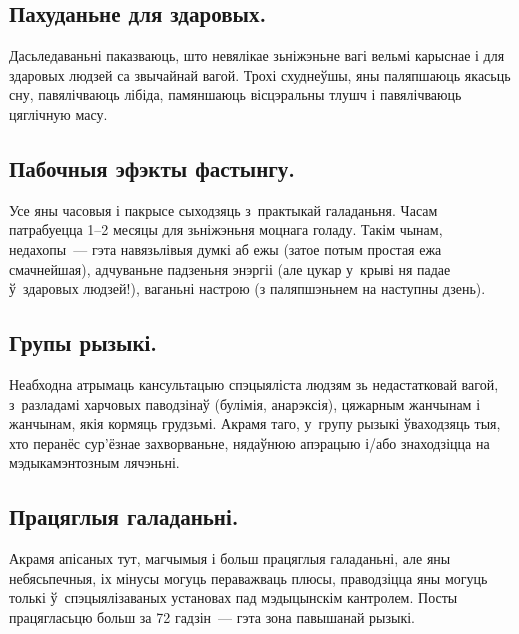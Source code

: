 \subsection{Пахуданьне для здаровых.}
Дасьледаваньні паказваюць, што невялікае зьніжэньне вагі вельмі карыснае і для здаровых людзей са звычайнай вагой. Трохі схуднеўшы, яны паляпшаюць якасьць сну, павялічваюць лібіда, памяншаюць вісцэральны тлушч і павялічваюць цяглічную масу.

\subsection{Пабочныя эфэкты фастынгу.}
Усе яны часовыя і пакрысе сыходзяць з~практыкай галаданьня. Часам патрабуецца 1--2 месяцы для зьніжэньня моцнага голаду. Такім чынам, недахопы~--- гэта навязьлівыя думкі аб ежы (затое потым простая ежа смачнейшая), адчуваньне падзеньня энэргіі (але цукар у~крыві ня падае ў~здаровых людзей!), ваганьні настрою (з паляпшэньнем на наступны дзень).

\subsection{Групы рызыкі.}
Неабходна атрымаць кансультацыю спэцыяліста людзям зь недастатковай вагой, з~разладамі харчовых паводзінаў (булімія, анарэксія), цяжарным жанчынам і жанчынам, якія кормяць грудзьмі. Акрамя таго, у~групу рызыкі ўваходзяць тыя, хто перанёс сур'ёзнае захворваньне, нядаўнюю апэрацыю і/або знаходзіцца на мэдыкамэнтозным лячэньні.


\subsection{Працяглыя галаданьні.}
Акрамя апісаных тут, магчымыя і больш працяглыя галаданьні, але яны небясьпечныя, іх мінусы могуць пераважваць плюсы, праводзіцца яны могуць толькі ў~спэцыялізаваных установах пад мэдыцынскім кантролем. Посты працягласьцю больш за 72 гадзін~--- гэта зона павышанай рызыкі.